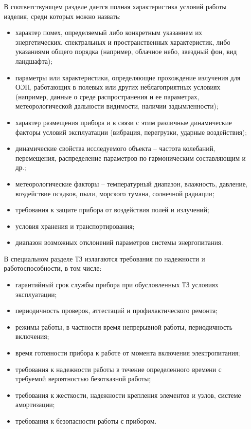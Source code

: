 В соответствующем разделе дается полная характеристика условий работы изделия, среди которых можно назвать:
\begin{itemize}
	\item характер помех, определяемый либо конкретным указанием их энергетических, спектральных и пространственных характеристик, либо указаниями общего порядка (например, облачное небо, звездный фон, вид ландшафта);
	\item параметры или характеристики, определяющие прохождение излучения для ОЭП, работающих в полевых или других неблагоприятных условиях (например, данные о среде распространения и ее параметрах, метеорологической дальности видимости, наличии задымленности);
	\item характер размещения прибора и в связи с этим различные динамические факторы условий эксплуатации (вибрация, перегрузки, ударные воздействия);
	\item динамические свойства исследуемого объекта -- частота колебаний, перемещения, распределение параметров по гармоническим составляющим и др.;
	\item метеорологические факторы -- температурный диапазон, влажность, давление, воздействие осадков, пыли, морского тумана, солнечной радиации;
	\item требования к защите прибора от воздействия полей и излучений;
	\item условия хранения и транспортирования;
	\item диапазон возможных отклонений параметров системы энергопитания.
\end{itemize}

В специальном разделе ТЗ излагаются требования по надежности и работоспособности, в том числе:
\begin{itemize}
	\item гарантийный срок службы прибора при обусловленных ТЗ условиях эксплуатации;
	\item периодичность проверок, аттестаций и профилактического ремонта;
	\item режимы работы, в частности время непрерывной работы, периодичность включения;
	\item время готовности прибора к работе от момента включения электропитания;
	\item требования к надежности работы в течение определенного времени с требуемой вероятностью безотказной работы;
	\item требования к жесткости, надежности крепления элементов и узлов, системе амортизации;
	\item требования к безопасности работы с прибором.
\end{itemize}

